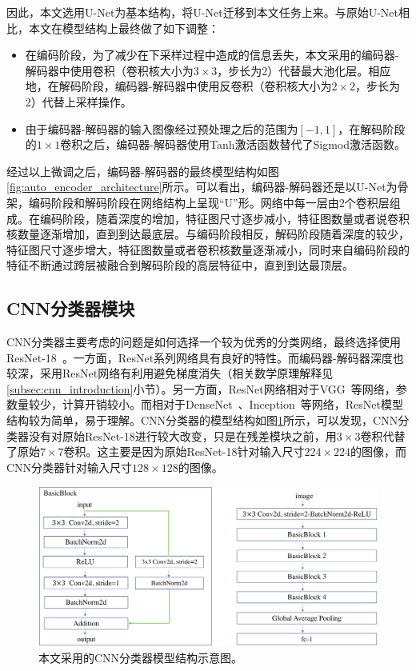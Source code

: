 因此，本文选用U-Net为基本结构，将U-Net迁移到本文任务上来。与原始U-Net相比，本文在模型结构上最终做了如下调整：
\begin{itemize}
	\item 在编码阶段，为了减少在下采样过程中造成的信息丢失，本文采用的编码器-解码器中使用卷积（卷积核大小为$3\times 3$，步长为2）代替最大池化层。相应地，在解码阶段，编码器-解码器中使用反卷积（卷积核大小为$2\times 2$，步长为2）代替上采样操作。
	\item 由于编码器-解码器的输入图像经过预处理之后的范围为$[-1,1]$，在解码阶段的$1\times 1$卷积之后，编码器-解码器使用Tanh激活函数替代了Sigmod激活函数。
\end{itemize}
经过以上微调之后，编码器-解码器的最终模型结构如图\ref{fig:auto_encoder_architecture}所示。可以看出，编码器-解码器还是以U-Net为骨架，编码阶段和解码阶段在网络结构上呈现“U”形。网络中每一层由2个卷积层组成。在编码阶段，随着深度的增加，特征图尺寸逐步减小，特征图数量或者说卷积核数量逐渐增加，直到到达最底层。与编码阶段相反，解码阶段随着深度的较少，特征图尺寸逐步增大，特征图数量或者卷积核数量逐渐减小，同时来自编码阶段的特征不断通过跨层被融合到解码阶段的高层特征中，直到到达最顶层。
\subsection{CNN分类器模块}\label{subsec:cnn_classifier_model}
CNN分类器主要考虑的问题是如何选择一个较为优秀的分类网络，最终选择使用ResNet-18~\cite{he2016deep}。一方面，ResNet系列网络具有良好的特性。而编码器-解码器深度也较深，采用ResNet网络有利用避免梯度消失（相关数学原理解释见\ref{subsec:cnn_introduction}小节）。另一方面，ResNet网络相对于VGG~\cite{simonyan2014very}等网络，参数量较少，计算开销较小。而相对于DenseNet~\cite{huang2017densely}、Inception~\cite{Szegedy2015RethinkingTI}等网络，ResNet模型结构较为简单，易于理解。CNN分类器的模型结构如图\ref{fig:classifier_architecture}所示，可以发现，CNN分类器没有对原始ResNet-18进行较大改变，只是在残差模块之前，用$3\times 3$卷积代替了原始$7\times 7$卷积。这主要是因为原始ResNet-18针对输入尺寸$224\times 224$的图像，而CNN分类器针对输入尺寸$128\times 128$的图像。
\begin{figure}[h]
	\centering
	\includegraphics[width=1.0\textwidth]{figure/classifier_architecture.png}
	\caption{本文采用的CNN分类器模型结构示意图。}
	\label{fig:classifier_architecture}
\end{figure}
